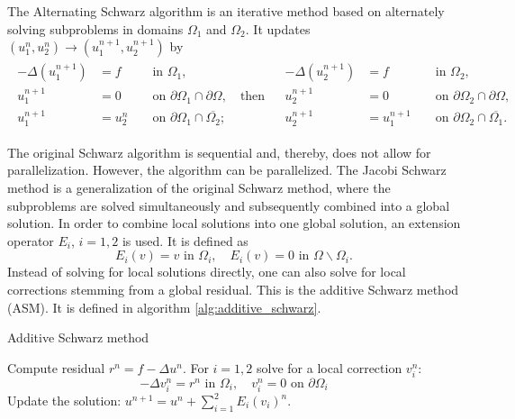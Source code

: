 \begin{definition}
    The Alternating Schwarz algorithm is an iterative method based on alternately solving subproblems in domains $\Omega_1$ and $\Omega_2$. It updates $\left(u_1^n, u_2^n\right) \rightarrow\left(u_1^{n+1}, u_2^{n+1}\right)$ by
    \[
        \begin{array}{cc}
            \begin{aligned}
                -\Delta\left(u_1^{n+1}\right) & =f     &  & \text { in } \Omega_1,                                                 \\
                u_1^{n+1}                     & =0     &  & \text { on } \partial \Omega_1 \cap \partial \Omega, \quad \text{then} \\
                u_1^{n+1}                     & =u_2^n &  & \text { on } \partial \Omega_1 \cap \overline{\Omega_2} ;
            \end{aligned} &
            \begin{aligned}
                -\Delta\left(u_2^{n+1}\right) & =f         &  & \text { in } \Omega_2,                                   \\
                u_2^{n+1}                     & =0         &  & \text { on } \partial \Omega_2 \cap \partial \Omega,     \\
                u_2^{n+1}                     & =u_1^{n+1} &  & \text { on } \partial \Omega_2 \cap \overline{\Omega_1}.
            \end{aligned}
        \end{array}
    \]
    \label{def:schwarz_algorithm}
\end{definition}

The original Schwarz algorithm is sequential and, thereby, does not allow for parallelization. However, the algorithm can be parallelized. The Jacobi Schwarz method is a generalization of the original Schwarz method, where the subproblems are solved simultaneously and subsequently combined into a global solution. In order to combine local solutions into one global solution, an extension operator $E_i$, $i=1,2$ is used. It is defined as
\[
    E_i(v)=v \text { in } \Omega_i, \quad E_i(v)=0 \text { in } \Omega \backslash \Omega_i.
\]
Instead of solving for local solutions directly, one can also solve for local corrections stemming from a global residual. This is the additive Schwarz method (ASM). It is defined in algorithm \ref{alg:additive_schwarz}.
\begin{algorithm}[H]
    \caption{Additive Schwarz method \cite[Algorithm 1.2]{schwarz_methods_Dolean_2015}}
    \label{alg:additive_schwarz}
    \begin{algorithmic}
        \State Compute residual $r^n=f-\Delta u^n$.
        \State For $i=1,2$ solve for a local correction $v_i^n$:
        \[
            -\Delta v_i^n=r^n \text{ in } \Omega_i, \quad v_i^n=0 \text{ on } \partial \Omega_i
        \]
        \State Update the solution: $u^{n+1}=u^n+\sum_{i=1}^{2}E_i(v_i)^n$.
    \end{algorithmic}
\end{algorithm}

